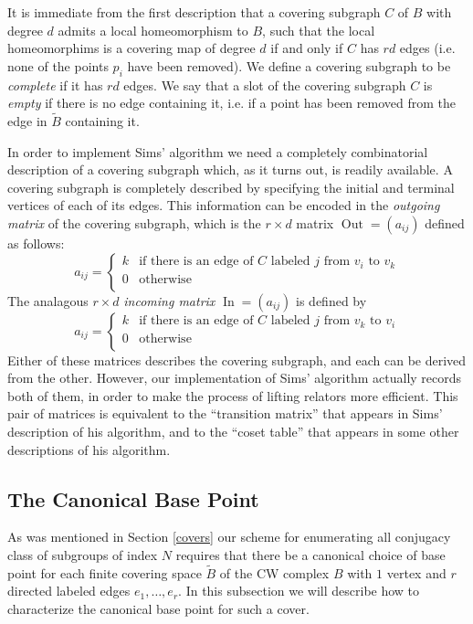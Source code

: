 \documentclass[12pt]{article}
\theoremstyle{definition}
\renewcommand{\tilde}{\widetilde}
\begin{document}
   It is immediate from the first description that a covering subgraph $C$ of
   $B$ with degree $d$ admits a local homeomorphism to $B$, such that the local
   homeomorphims is a covering map of degree $d$ if and only if $C$ has $rd$
   edges (i.e. none of the points $p_i$ have been removed).  We define a
   covering subgraph to be {\it complete} if it has $rd$ edges.  We say that a
   slot of the covering subgraph $C$ is {\it empty} if there is no edge containing
   it, i.e. if a point has been removed from the edge in $\tilde B$ containing
   it.

   In order to implement Sims' algorithm we need a completely combinatorial
   description of a covering subgraph which, as it turns out, is readily available.
   A covering subgraph is completely described by specifying the initial and
   terminal vertices of each of its edges.  This information can be encoded in
   the {\it outgoing matrix} of the covering subgraph, which is the $r\times d$
   matrix $\mathop{Out(C)} = (a_{ij})$ defined as follows:
   \[ a_{ij} =
     \begin{cases}
       k & \text{if there is an edge of $C$ labeled $j$ from $v_i$ to $v_k$}\\
       0 & \text{otherwise}\\
     \end{cases}
   \]
 The analagous $r\times d$ {\it incoming matrix} $\mathop{In(C)} =
 (a_{ij})$ is defined by
   \[ a_{ij} =
     \begin{cases}
       k & \text{if there is an edge of $C$ labeled $j$ from $v_k$ to $v_i$}\\
       0 & \text{otherwise}\\
     \end{cases}
   \]
   Either of these matrices describes the covering subgraph, and each can be
   derived from the other.  However, our implementation of Sims' algorithm
   actually records both of them, in order to make the process of lifting
   relators more efficient.  This pair of matrices is equivalent to the
   ``transition matrix'' that appears in Sims' description of his algorithm, and
   to the ``coset table'' that appears in some other descriptions of his
   algorithm.
       
   \subsection{The Canonical Base Point}
   As was mentioned in Section \ref{covers} our scheme for enumerating all
   conjugacy class of subgroups of index $N$ requires that there be a canonical
   choice of base point for each finite covering space $\tilde B$ of the CW
   complex $B$ with $1$ vertex and $r$ directed labeled edges
   $e_1, \ldots, e_r$.  In this subsection we will describe how to characterize
   the canonical base point for such a cover.
\end{document}
